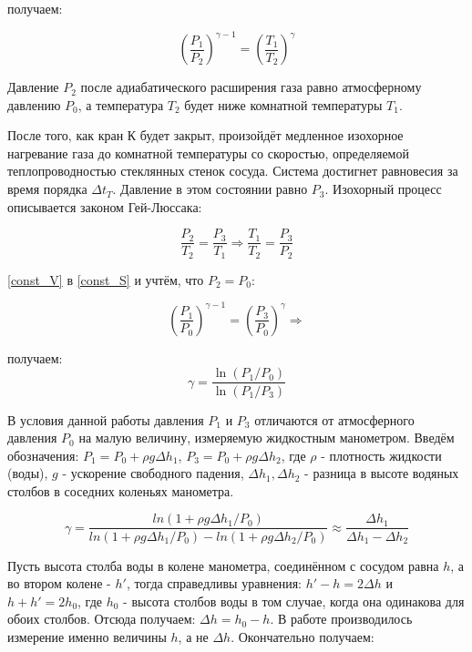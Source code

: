 \documentclass[15pt,a5paper,reqno]{article}
\begin{document}
	 получаем:
	
	\begin{equation}\label{const_S}
	    \left(\frac{P_1}{P_2}\right)^{\gamma - 1} = \left(\frac{T_1}{T_2}\right)^{\gamma}
	\end{equation}
	
	Давление $P_2$ после адиабатического расширения газа равно атмосферному давлению $P_0$, а температура $T_2$ будет ниже комнатной температуры $T_1$.
	
	После того, как кран К будет закрыт, произойдёт медленное изохорное нагревание газа до комнатной температуры со скоростью, определяемой теплопроводностью стеклянных стенок сосуда. Система достигнет равновесия за время порядка $\Delta t_T$. Давление в этом состоянии равно $P_3$. Изохорный процесс описывается законом Гей-Люссака:
	
	\begin{equation}\label{const_V}
	    \frac{P_2}{T_2} = \frac{P_3}{T_1} \Rightarrow \frac{T_1}{T_2} = \frac{P_3}{P_2}
	\end{equation}
	
	 \eqref{const_V} в \eqref{const_S} и учтём, что $P_2 = P_0$:
	
	\begin{equation}
	    \left(\frac{P_1}{P_0}\right)^{\gamma - 1} = \left(\frac{P_3}{P_0}\right)^{\gamma} \Rightarrow
	\end{equation}
	
	 получаем:
	\begin{equation}
	    \gamma = \frac{\ln{(P_1/P_0)}}{\ln{(P_1/P_3)}}
	\end{equation}
	
	В условия данной работы давления $P_1$ и $P_3$ отличаются от атмосферного давления $P_0$ на малую величину, измеряемую жидкостным манометром. Введём обозначения: $P_1 = P_0 + \rho g\Delta h_1$, $P_3 = P_0 + \rho g\Delta h_2$, где $\rho$ - плотность жидкости (воды), $g$ - ускорение свободного падения, $\Delta h_1, \Delta h_2$ - разница в высоте водяных столбов в соседних коленьях манометра.
	
	\begin{equation}
	    \gamma = \frac{ln{(1 + \rho g\Delta h_1/P_0)}}{ln{(1 + \rho g\Delta h_1/P_0)} - ln{(1 + \rho g\Delta h_2/P_0)}} \approx \frac{\Delta h_1}{\Delta h_1 - \Delta h_2}
	\end{equation}
	
	Пусть высота столба воды в колене манометра, соединённом с сосудом равна $h$, а во втором колене - $h'$, тогда справедливы уравнения: $h' - h = 2\Delta h$ и $h + h' = 2h_0$, где $h_0$ - высота столбов воды в том случае, когда она одинакова для обоих столбов. Отсюда получаем: $\Delta h = h_0 - h$. В работе производилось измерение именно величины $h$, а не $\Delta h$. Окончательно получаем:
	
\end{document}
